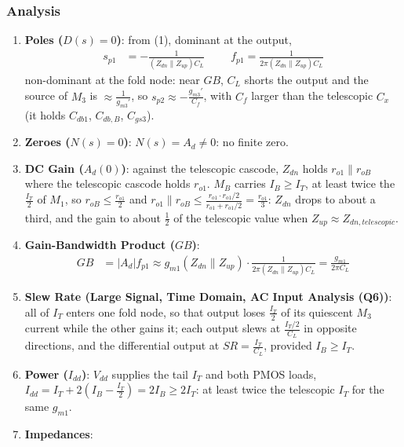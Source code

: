 \subsubsection{Analysis}
\begin{enumerate}
  \item \textbf{Poles (\(D(s) = 0\))}: from (1), dominant at the output,
    \begin{align*}
      s_{p1} &= -\frac{1}{(Z_{dn} \parallel Z_{up}) C_L} \hspace{1cm} f_{p1} = \frac{1}{2\pi (Z_{dn} \parallel Z_{up}) C_L}
    \end{align*}
    non-dominant at the fold node: near \(GB\), \(C_L\) shorts the output and the source of \(M_3\)
    is \(\approx \frac{1}{g_{m3}'}\), so \(s_{p2} \approx -\frac{g_{m3}'}{C_f}\), with \(C_f\) larger than the telescopic
    \(C_x\) (it holds \(C_{db1}\), \(C_{db,B}\), \(C_{gs3}\)).
  \item \textbf{Zeroes (\(N(s) = 0\))}: \(N(s) = A_d \neq 0\): no finite zero.
  \item \textbf{DC Gain (\(A_d(0)\))}: against the telescopic cascode, \(Z_{dn}\) holds \(r_{o1} \parallel r_{oB}\) where the telescopic
    cascode holds \(r_{o1}\). \(M_B\) carries \(I_B \geq I_T\), at least twice the
    \(\frac{I_T}{2}\) of \(M_1\), so \(r_{oB} \leq \frac{r_{o1}}{2}\) and
    \(r_{o1} \parallel r_{oB} \leq \frac{r_{o1} \cdot r_{o1}/2}{r_{o1} + r_{o1}/2} = \frac{r_{o1}}{3}\):
    \(Z_{dn}\) drops to about a third, and the gain to about \(\frac{1}{2}\) of the
    telescopic value when \(Z_{up} \approx Z_{dn,telescopic}\).
  \item \textbf{Gain-Bandwidth Product (\(GB\))}:
    \begin{align*}
      GB &= |A_d| f_{p1} \approx g_{m1}(Z_{dn} \parallel Z_{up})\cdot\frac{1}{2\pi (Z_{dn} \parallel Z_{up}) C_L} = \frac{g_{m1}}{2\pi C_L}
    \end{align*}
  \item \textbf{Slew Rate (Large Signal, Time Domain, AC Input Analysis (Q6))}: all
    of \(I_T\) enters one fold node, so that output loses
    \(\frac{I_T}{2}\) of its quiescent \(M_3\) current while the other gains it;
    each output slews at \(\frac{I_T/2}{C_L}\) in opposite directions, and the
    differential output at \(SR = \frac{I_T}{C_L}\), provided \(I_B \geq I_T\).
  \item \textbf{Power (\(I_{dd}\))}: \(V_{dd}\) supplies the tail \(I_T\) and both PMOS loads,
    \(I_{dd} = I_T + 2\left(I_B - \frac{I_T}{2}\right) = 2 I_B \geq 2 I_T\): at least twice the
    telescopic \(I_T\) for the same \(g_{m1}\).
  \item \textbf{Impedances}:

\end{enumerate}
